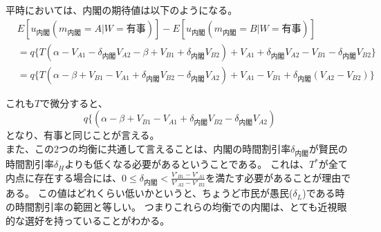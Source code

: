 \documentclass[main.tex]{subfiles}
\begin{document}
平時においては、内閣の期待値は以下のようになる。
\begin{align*}
    &E[u_{内閣}(m_{内閣}=A|W=有事)] - E[u_{内閣}(m_{内閣}=B|W=有事)] \\
    &= q\lbrace T(\alpha -V_{A1} -\delta_{内閣}V_{A2} - \beta + V_{B1} + \delta_{内閣}V_{B2}) + V_{A1} + \delta_{内閣}V_{A2} - V_{B1} - \delta_{内閣}V_{B2}  \rbrace\\
    &= q\lbrace T(\alpha - \beta + V_{B1}-V_{A1} + \delta_{内閣}V_{B2} -\delta_{内閣}V_{A2}   ) + V_{A1} - V_{B1} + \delta_{内閣}(V_{A2}  - V_{B2})  \rbrace
\end{align*}

これも$T$で微分すると、
$$q\lbrace (\alpha - \beta + V_{B1}-V_{A1} + \delta_{内閣}V_{B2} -\delta_{内閣}V_{A2}   )$$
となり、有事と同じことが言える。\\



また、この2つの均衡に共通して言えることは、内閣の時間割引率$\delta_{内閣}$が賢民の時間割引率$\delta_H$よりも低くなる必要があるということである。
これは、$T^*$が全て内点に存在する場合には、$0\le \delta_{内閣} < \frac{V'_{B1} - V'_{A1}}{V'_{A2} - V'_{B2}}$を満たす必要があることが理由である。
この値はどれくらい低いかというと、ちょうど市民が愚民($\delta_L$)である時の時間割引率の範囲と等しい。
つまりこれらの均衡での内閣は、とても近視眼的な選好を持っていることがわかる。























\end{document}
